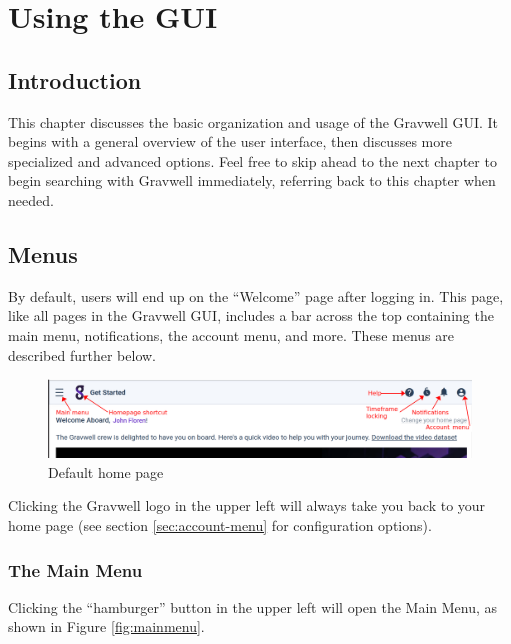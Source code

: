 \chapter{Using the GUI}

\section{Introduction}

This chapter discusses the basic organization and usage of the Gravwell GUI. It begins with a general overview of the user interface, then discusses more specialized and advanced options. Feel free to skip ahead to the next chapter to begin searching with Gravwell immediately, referring back to this chapter when needed.

\section{Menus}
By default, users will end up on the ``Welcome'' page after logging in. This page, like all pages in the Gravwell GUI, includes a bar across the top containing the main menu, notifications, the account menu, and more. These menus are described further below.

\begin{figure}
	\includegraphics{images/homepage.png}
	\caption{Default home page}
	\label{fig:newsearch}
\end{figure}

Clicking the Gravwell logo in the upper left will always take you back to your home page (see section \ref{sec:account-menu} for configuration options).

\subsection{The Main Menu}

Clicking the ``hamburger'' button in the upper left will open the Main Menu, as shown in Figure \ref{fig:mainmenu}.

